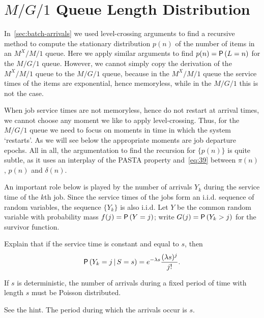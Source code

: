 \section{$M/G/1$ Queue Length Distribution}
\label{sec:distr-queue-length}




In~\cref{sec:batch-arrivals} we used level-crossing arguments to find a recursive method to compute the stationary distribution $p(n)$ of the number of items in an $M^X/M/1$ queue.
Here we apply similar arguments to find $p(n)=\P{L=n}$ for the $M/G/1$ queue.
However, we cannot simply copy the derivation of the $M^X/M/1$ queue to the $M/G/1$ queue, because in the $M^X/M/1$ queue the service times of the items are exponential, hence memoryless, while in the $M/G/1$ this is not the case.


When job service times are not memoryless, hence do not restart at arrival times, we cannot choose any moment we like to apply level-crossing.
Thus, for the $M/G/1$ queue we need to focus on moments in time in which the system `restarts'.
As we will see below the appropriate moments are job departure epochs.
All in all, the argumentation to find the recursion for $\{p(n)\}$ is quite subtle, as it uses an interplay of the PASTA property and~\cref{eq:39} between $\pi(n)$, $p(n)$ and $\delta(n)$.

An important role below is played by the number of arrivals $Y_k$ during the service time of the $k$th job. Since the service times of the jobs form an i.i.d. sequence of random variables, the sequence $\{Y_k\}$ is also i.i.d. Let $Y$ be the common random variable with probability mass
 $f(j) = \P{Y = j}$; write $G(j) = \P{Y_k > j}$ for the survivor function.


\begin{extra}
 Explain that if the service time is constant and equal to $s$, then
\begin{equation}\label{eq:4}
 \P{Y_k = j\given S=s} = e^{-\lambda s}\frac{(\lambda s)^j}{j!}.
\end{equation}
\begin{hint}
If $s$ is deterministic, the number of arrivals during a fixed
 period of time with length $s$ must be Poisson distributed.
\end{hint}
\begin{solution}
See the hint. The period during which the arrivals occur is $s$. 
\end{solution}
\end{extra}

